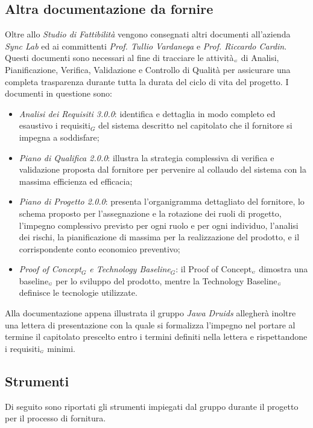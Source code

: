 \subsection{Altra documentazione da fornire}\label{ProcessiPrimariFornituraAltraDocumentazioneDaFornire}
Oltre allo \textit{Studio di Fattibilità} vengono consegnati altri documenti all'azienda \textit{Sync Lab} ed ai committenti \textit{Prof. Tullio Vardanega} e \textit{Prof. Riccardo Cardin}. Questi documenti sono necessari al fine di tracciare le attività$_{\scaleto{G}{3pt}}$ di Analisi, Pianificazione, Verifica, Validazione e Controllo di Qualità per assicurare una completa trasparenza durante tutta la durata del ciclo di vita del progetto.
I documenti in questione sono:
\begin{itemize}
	\item \textit{Analisi dei Requisiti 3.0.0}: identifica e dettaglia in modo completo ed esaustivo i requisiti$_G$ del sistema descritto nel capitolato che il fornitore si impegna a soddisfare;
	\item \textit{Piano di Qualifica 2.0.0}: illustra la strategia complessiva di verifica e validazione proposta dal fornitore per pervenire al collaudo del sistema con la massima efficienza ed efficacia;
	\item \textit{Piano di Progetto 2.0.0}: presenta l'organigramma dettagliato del fornitore, lo schema proposto per l'assegnazione e la rotazione dei ruoli di progetto, l'impegno complessivo previsto per ogni ruolo e per ogni individuo, l'analisi dei rischi, la pianificazione di massima per la realizzazione del prodotto, e il corrispondente conto economico preventivo;
	\item \textit{Proof of Concept$_G$ e Technology Baseline$_G$}: il Proof of Concept$_{\scaleto{G}{3pt}}$ dimostra una baseline$_{\scaleto{G}{3pt}}$ per lo sviluppo del prodotto, mentre la Technology Baseline$_{\scaleto{G}{3pt}}$ definisce le tecnologie utilizzate.
\end{itemize}
Alla documentazione appena illustrata il gruppo \textit{Jawa Druids} allegherà inoltre una lettera di presentazione con la quale si formalizza l'impegno nel portare al termine il capitolato prescelto entro i termini definiti nella lettera e rispettandone i requisiti$_{\scaleto{G}{3pt}}$ minimi.
\subsection{Strumenti}\label{ProcessiPrimariFornituraStrumenti}
Di seguito sono riportati gli strumenti impiegati dal gruppo durante il progetto per il processo di fornitura.
